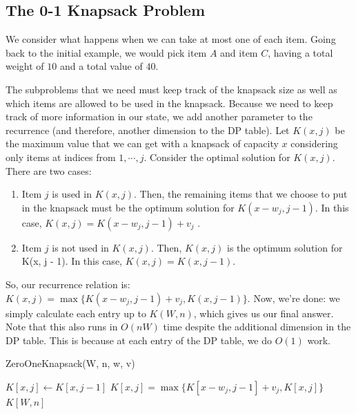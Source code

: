 \documentclass [12pt]{article}
\theoremstyle{definition}
\begin{document}
\subsection{The 0-1 Knapsack Problem}

We consider what happens when we can take at most one of each item. Going back to the initial example, we would pick item $A$ and item $C$, having a total weight of $10$ and a total value of $40$.

The subproblems that we need must keep track of the knapsack size as well as which items are allowed to be used in the knapsack. Because we need to keep track of more information in our state, we add another parameter to the recurrence (and therefore, another dimension to the DP table). Let $K(x, j)$ be the maximum value that we can get with a knapsack of capacity $x$ considering only items at indices from $1, \cdots , j$. Consider the optimal solution for $K(x, j)$. There are two cases: 

\begin{enumerate}
  \item Item $j$ is used in $K(x, j)$. Then, the remaining items that we choose to put in the knapsack must be the optimum solution for $K(x - w_j , j - 1)$. In this case, $K(x, j) = K(x - w_j , j - 1) + v_j$ .
  \item Item $j$ is not used in $K(x, j)$. Then, $K(x, j)$ is the optimum solution for K(x, j - 1). In this case, $K(x, j) = K(x, j - 1)$.
\end{enumerate}

So, our recurrence relation is: $K(x, j) = \max\{K(x -w_j , j -1) +v_j , K(x, j -1)\}$. Now, we’re done: we simply calculate each entry up to $K(W, n)$, which gives us our final answer. Note that this also runs in $O(nW)$ time despite the additional dimension in the DP table. This is because at each entry of the DP table, we do $O(1)$ work.

\begin{algorithm}
\caption{ZeroOneKnapsack(W, n, w, v)}
\label{alg:zerooneknapsack}
\begin{algorithmic}
\State {}
\State {}
\State {} {
   {
    $K[x, j] \gets K[x, j-1]$
    \State {} {
        $K[x, j] = \max\{K[x - w_j, j-1] + v_j, K[x, j] \}$
    }
  }
}
\State \Return $K[W, n]$
\end{algorithmic}
\end{algorithm}
\end{document}
